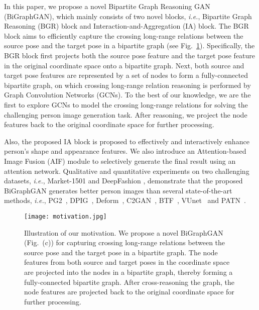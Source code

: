 \documentclass{bmvc2k}
\begin{document}
In this paper, we propose a novel Bipartite Graph Reasoning GAN (BiGraphGAN), which mainly consists of two novel blocks, \emph{i.e.}, Bipartite Graph Reasoning (BGR) block and Interaction-and-Aggregation (IA) block.
The BGR block aims to efficiently capture the crossing long-range relations between the source pose and the target pose in a bipartite graph (see Fig.~\ref{fig:motivation}). 
Specifically, the BGR block first projects both the source pose feature and the target pose feature in the original coordinate space onto a bipartite graph.
Next, both source and target pose features are represented by a set of nodes to form a fully-connected bipartite graph, on which crossing long-range relation reasoning is performed by Graph Convolution Networks (GCNs). 
To the best of our knowledge, we are the first to explore GCNs to model the crossing long-range relations for solving the challenging person image generation task.
After reasoning, we project the node features back to the original coordinate space for further processing. 

Also, the proposed IA block is proposed to effectively and interactively enhance person's shape and appearance features.
We also introduce an Attention-based Image Fusion (AIF) module to selectively generate the final result using an attention network.
Qualitative and quantitative experiments on two challenging datasets, \emph{i.e.}, Market-1501 \cite{zheng2015scalable} and DeepFashion \cite{liu2016deepfashion}, demonstrate that the proposed BiGraphGAN generates better person images than several state-of-the-art methods, \emph{i.e.}, PG2~\cite{ma2017pose}, DPIG~\cite{ma2018disentangled}, Deform~\cite{siarohin2018deformable}, C2GAN~\cite{tang2019cycle}, BTF~\cite{albahar2019guided}, VUnet~\cite{esser2018variational} and PATN~\cite{zhu2019progressive}.

\begin{figure}[!t]
	\centering
	\texttt{[image: motivation.jpg]}
	\caption{Illustration of our motivation. We propose a novel BiGraphGAN (Fig.~(c)) for capturing crossing long-range relations between the source pose  and the target pose  in a bipartite graph. The node features from both source and target poses in the coordinate space are projected into the nodes in a bipartite graph, thereby forming a fully-connected bipartite graph. After cross-reasoning the graph, the node features are projected back to the original coordinate space for further processing.}
	\label{fig:motivation}
\end{figure}
\end{document}
